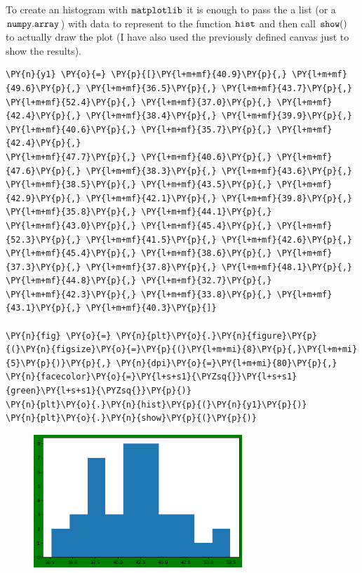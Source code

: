 To create an histogram with \(\tt{matplotlib}\) it is enough to pass the
a list (or a \(\tt{numpy.array}\)) with data to represent to the
function \(\tt{hist}\) and then call \(\tt{show()}\) to actually draw
the plot (I have also used the previously defined canvas just to show
the results).

\begin{tcolorbox}[breakable, size=fbox, boxrule=1pt, pad at break*=1mm,colback=cellbackground, colframe=cellborder]
\begin{Verbatim}[commandchars=\\\{\}]
\PY{n}{y1} \PY{o}{=} \PY{p}{[}\PY{l+m+mf}{40.9}\PY{p}{,} \PY{l+m+mf}{49.6}\PY{p}{,} \PY{l+m+mf}{36.5}\PY{p}{,} \PY{l+m+mf}{43.7}\PY{p}{,} \PY{l+m+mf}{52.4}\PY{p}{,} \PY{l+m+mf}{37.0}\PY{p}{,} \PY{l+m+mf}{42.4}\PY{p}{,} \PY{l+m+mf}{38.4}\PY{p}{,} \PY{l+m+mf}{39.9}\PY{p}{,} \PY{l+m+mf}{40.6}\PY{p}{,} \PY{l+m+mf}{35.7}\PY{p}{,} \PY{l+m+mf}{42.4}\PY{p}{,} 
\PY{l+m+mf}{47.7}\PY{p}{,} \PY{l+m+mf}{40.6}\PY{p}{,} \PY{l+m+mf}{47.6}\PY{p}{,} \PY{l+m+mf}{38.3}\PY{p}{,} \PY{l+m+mf}{43.6}\PY{p}{,} \PY{l+m+mf}{38.5}\PY{p}{,} \PY{l+m+mf}{43.5}\PY{p}{,} \PY{l+m+mf}{42.9}\PY{p}{,} \PY{l+m+mf}{42.1}\PY{p}{,} \PY{l+m+mf}{39.8}\PY{p}{,} \PY{l+m+mf}{35.8}\PY{p}{,} \PY{l+m+mf}{44.1}\PY{p}{,} 
\PY{l+m+mf}{43.0}\PY{p}{,} \PY{l+m+mf}{45.4}\PY{p}{,} \PY{l+m+mf}{52.3}\PY{p}{,} \PY{l+m+mf}{41.5}\PY{p}{,} \PY{l+m+mf}{42.6}\PY{p}{,} \PY{l+m+mf}{45.4}\PY{p}{,} \PY{l+m+mf}{38.6}\PY{p}{,} \PY{l+m+mf}{37.3}\PY{p}{,} \PY{l+m+mf}{37.8}\PY{p}{,} \PY{l+m+mf}{48.1}\PY{p}{,} \PY{l+m+mf}{44.8}\PY{p}{,} \PY{l+m+mf}{32.7}\PY{p}{,} 
\PY{l+m+mf}{42.3}\PY{p}{,} \PY{l+m+mf}{33.8}\PY{p}{,} \PY{l+m+mf}{43.1}\PY{p}{,} \PY{l+m+mf}{40.3}\PY{p}{]}
	
\PY{n}{fig} \PY{o}{=} \PY{n}{plt}\PY{o}{.}\PY{n}{figure}\PY{p}{(}\PY{n}{figsize}\PY{o}{=}\PY{p}{(}\PY{l+m+mi}{8}\PY{p}{,}\PY{l+m+mi}{5}\PY{p}{)}\PY{p}{,} \PY{n}{dpi}\PY{o}{=}\PY{l+m+mi}{80}\PY{p}{,} \PY{n}{facecolor}\PY{o}{=}\PY{l+s+s1}{\PYZsq{}}\PY{l+s+s1}{green}\PY{l+s+s1}{\PYZsq{}}\PY{p}{)}
\PY{n}{plt}\PY{o}{.}\PY{n}{hist}\PY{p}{(}\PY{n}{y1}\PY{p}{)}
\PY{n}{plt}\PY{o}{.}\PY{n}{show}\PY{p}{(}\PY{p}{)}
\end{Verbatim}
\end{tcolorbox}

\begin{figure}[h]
	\centering
	\includegraphics[width=0.7\textwidth]{figures/matplotlib_3_0.png}
\end{figure}

